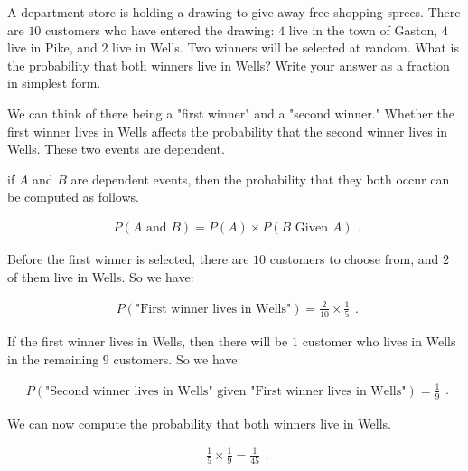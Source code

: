 
A department store is holding a drawing to give away free shopping sprees. There
are $10$  customers who have entered the drawing: $4$ live in the town of
Gaston, $4$ live in Pike, and $2$ live in Wells. Two winners will be selected at
random. What is the probability that both winners live in Wells? Write your
answer as a fraction in simplest form.

We can think of there being a "first winner" and a "second winner." Whether the
first winner lives in Wells affects the probability that the second winner lives
in Wells. These two events are dependent.

if $A$ and $B$ are dependent events, then the probability that they both occur
can be computed as follows.

\begin{equation}
  \label{eqt:probability_of_A_and_B}
  \begin{split}
    P(\textrm{$A$ and $B$}) = P(A) \times P(\textrm{$B$ Given $A$})
  \end{split}
.\end{equation}

Before the first winner is selected, there are $10$  customers to choose from,
and $2$  of them live in Wells. So we have:

\begin{equation}
  \label{eqt:two_to_choose_from}
  \begin{split}
    P(\textrm{"First winner lives in Wells"}) = \frac{2}{10} \times \frac{1}{5}
  \end{split}
.\end{equation}

If the first winner lives in Wells, then there will be $1$ customer who lives in
Wells in the remaining $9$ customers. So we have:

\begin{equation}
  \label{eqt:remaining_customers}
  \begin{split}
    P(\textrm{"Second winner lives in Wells" given "First winner lives in
    Wells"}) = \frac{1}{9}
  \end{split}
.\end{equation}

We can now compute the probability that both winners live in Wells.

\begin{equation}
  \label{eqt:final_probability}
  \begin{split}
    \frac{1}{5} \times \frac{1}{9} = \frac{1}{45}
  \end{split}
.\end{equation}

\newpage

